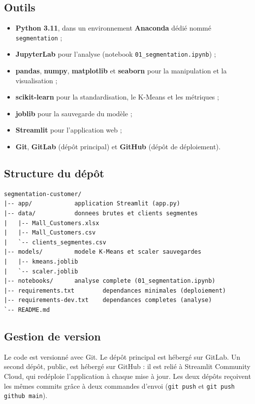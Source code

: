 \documentclass[11pt,a4paper]{article}
\begin{document}
\subsection{Outils}
\begin{itemize}
  \item \textbf{Python 3.11}, dans un environnement \textbf{Anaconda} dédié nommé \texttt{segmentation} ;
  \item \textbf{JupyterLab} pour l'analyse (notebook \texttt{01\_segmentation.ipynb}) ;
  \item \textbf{pandas}, \textbf{numpy}, \textbf{matplotlib} et \textbf{seaborn} pour la manipulation et la visualisation ;
  \item \textbf{scikit-learn} pour la standardisation, le K-Means et les métriques ;
  \item \textbf{joblib} pour la sauvegarde du modèle ;
  \item \textbf{Streamlit} pour l'application web ;
  \item \textbf{Git}, \textbf{GitLab} (dépôt principal) et \textbf{GitHub} (dépôt de déploiement).
\end{itemize}

\subsection{Structure du dépôt}
\begin{lstlisting}
segmentation-customer/
|-- app/            application Streamlit (app.py)
|-- data/           donnees brutes et clients segmentes
|   |-- Mall_Customers.xlsx
|   |-- Mall_Customers.csv
|   `-- clients_segmentes.csv
|-- models/         modele K-Means et scaler sauvegardes
|   |-- kmeans.joblib
|   `-- scaler.joblib
|-- notebooks/      analyse complete (01_segmentation.ipynb)
|-- requirements.txt        dependances minimales (deploiement)
|-- requirements-dev.txt    dependances completes (analyse)
`-- README.md
\end{lstlisting}

\subsection{Gestion de version}
Le code est versionné avec Git. Le dépôt principal est hébergé sur GitLab. Un second dépôt, public, est hébergé sur GitHub : il est relié à Streamlit Community Cloud, qui redéploie l'application à chaque mise à jour. Les deux dépôts reçoivent les mêmes commits grâce à deux commandes d'envoi (\texttt{git push} et \texttt{git push github main}).
\end{document}
